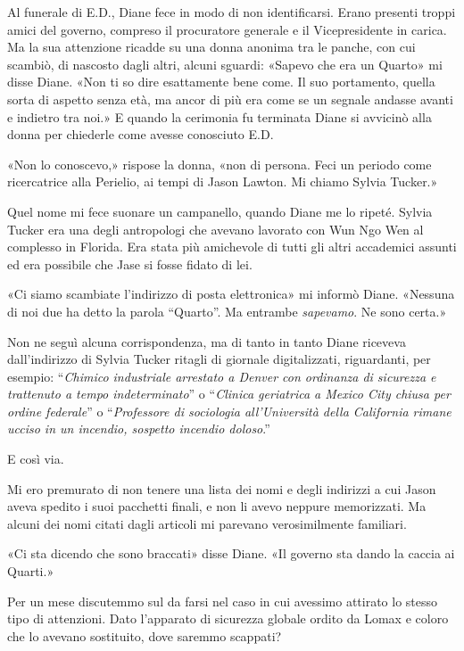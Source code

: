 Al funerale di E.D., Diane fece in modo di non identificarsi. Erano
presenti troppi amici del governo, compreso il procuratore generale e il
Vicepresidente in carica. Ma la sua attenzione ricadde su una donna
anonima tra le panche, con cui scambiò, di nascosto dagli altri, alcuni
sguardi: «Sapevo che era un Quarto» mi disse Diane. «Non ti so dire
esattamente bene come. Il suo portamento, quella sorta di aspetto senza
età, ma ancor di più era come se un segnale andasse avanti e indietro
tra noi.» E quando la cerimonia fu terminata Diane si avvicinò alla
donna per chiederle come avesse conosciuto E.D.

«Non lo conoscevo,» rispose la donna, «non di persona. Feci un periodo
come ricercatrice alla Perielio, ai tempi di Jason Lawton. Mi chiamo
Sylvia Tucker.»

Quel nome mi fece suonare un campanello, quando Diane me lo ripeté.
Sylvia Tucker era una degli antropologi che avevano lavorato con Wun Ngo
Wen al complesso in Florida. Era stata più amichevole di tutti gli altri
accademici assunti ed era possibile che Jase si fosse fidato di lei.

«Ci siamo scambiate l'indirizzo di posta elettronica» mi informò Diane.
«Nessuna di noi due ha detto la parola ``Quarto''. Ma entrambe
\emph{sapevamo}. Ne sono certa.»

Non ne seguì alcuna corrispondenza, ma di tanto in tanto Diane riceveva
dall'indirizzo di Sylvia Tucker ritagli di giornale digitalizzati,
riguardanti, per esempio: ``\emph{Chimico industriale arrestato a Denver
	con ordinanza di sicurezza e trattenuto a tempo indeterminato}'' o
``\emph{Clinica geriatrica a Mexico City chiusa per ordine federale}'' o
``\emph{Professore di sociologia all'Università della California rimane
	ucciso in un incendio, sospetto incendio doloso}.''

E così via.

Mi ero premurato di non tenere una lista dei nomi e degli indirizzi a
cui Jason aveva spedito i suoi pacchetti finali, e non li avevo neppure
memorizzati. Ma alcuni dei nomi citati dagli articoli mi parevano
verosimilmente familiari.

«Ci sta dicendo che sono braccati» disse Diane. «Il governo sta dando la
caccia ai Quarti.»

Per un mese discutemmo sul da farsi nel caso in cui avessimo attirato lo
stesso tipo di attenzioni. Dato l'apparato di sicurezza globale ordito
da Lomax e coloro che lo avevano sostituito, dove saremmo scappati?

